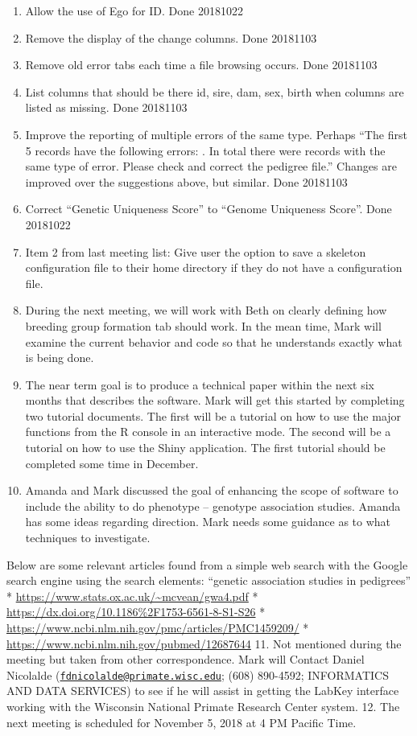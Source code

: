 \documentclass[
]{article}
\providecommand{\tightlist}{%
  \setlength{\itemsep}{0pt}\setlength{\parskip}{0pt}}
\begin{document}
\begin{enumerate}
\def\labelenumi{\arabic{enumi}.}
\tightlist
\item
  Allow the use of Ego for ID. Done 20181022
\item
  Remove the display of the change columns. Done 20181103
\item
  Remove old error tabs each time a file browsing occurs. Done 20181103
\item
  List columns that should be there id, sire, dam, sex, birth when
  columns are listed as missing. Done 20181103
\item
  Improve the reporting of multiple errors of the same type. Perhaps
  ``The first 5 records have the following errors: . In total there were
  records with the same type of error. Please check and correct the
  pedigree file.'' Changes are improved over the suggestions above, but
  similar. Done 20181103
\item
  Correct ``Genetic Uniqueness Score'' to ``Genome Uniqueness Score''.
  Done 20181022
\item
  Item 2 from last meeting list: Give user the option to save a skeleton
  configuration file to their home directory if they do not have a
  configuration file.
\item
  During the next meeting, we will work with Beth on clearly defining
  how breeding group formation tab should work. In the mean time, Mark
  will examine the current behavior and code so that he understands
  exactly what is being done.
\item
  The near term goal is to produce a technical paper within the next six
  months that describes the software. Mark will get this started by
  completing two tutorial documents. The first will be a tutorial on how
  to use the major functions from the R console in an interactive mode.
  The second will be a tutorial on how to use the Shiny application. The
  first tutorial should be completed some time in December.
\item
  Amanda and Mark discussed the goal of enhancing the scope of software
  to include the ability to do phenotype -- genotype association
  studies. Amanda has some ideas regarding direction. Mark needs some
  guidance as to what techniques to investigate.
\end{enumerate}

Below are some relevant articles found from a simple web search with the
Google search engine using the search elements: ``genetic association
studies in pedigrees'' *
\url{https://www.stats.ox.ac.uk/~mcvean/gwa4.pdf} *
\url{https://dx.doi.org/10.1186\%2F1753-6561-8-S1-S26} *
\url{https://www.ncbi.nlm.nih.gov/pmc/articles/PMC1459209/} *
\url{https://www.ncbi.nlm.nih.gov/pubmed/12687644} 11. Not mentioned
during the meeting but taken from other correspondence. Mark will
Contact Daniel Nicolalde
(\href{mailto:fdnicolalde@primate.wisc.edu}{\nolinkurl{fdnicolalde@primate.wisc.edu}};
(608) 890-4592; INFORMATICS AND DATA SERVICES) to see if he will assist
in getting the LabKey interface working with the Wisconsin National
Primate Research Center system. 12. The next meeting is scheduled for
November 5, 2018 at 4 PM Pacific Time.
\end{document}
